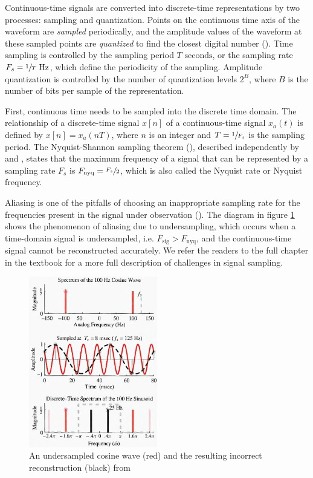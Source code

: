 \documentclass[report.tex]{subfiles}
\begin{document}
Continuous-time signals are converted into discrete-time representations by two processes: sampling and quantization. Points on the continuous time axis of the waveform are \textit{sampled} periodically, and the amplitude values of the waveform at these sampled points are \textit{quantized} to find the closest digital number (\cite[Chapter~2]{melbook}). Time sampling is controlled by the sampling period $T \text{ seconds}$, or the sampling rate $F_{s} = \sfrac{1}{T} \text{ Hz}$, which define the periodicity of the sampling. Amplitude quantization is controlled by the number of quantization levels $2^{B}$, where $B$ is the number of bits per sample of the representation.

First, continuous time needs to be sampled into the discrete time domain. The relationship of a discrete-time signal $x[n]$ of a continuous-time signal $x_{a}(t)$ is defined by $x[n] = x_{a}(nT)$, where $n$ is an integer and $T = \sfrac{1}{F_{s}}$ is the sampling period. The Nyquist-Shannon sampling theorem (\cite[Chapter~4]{discretebook}), described independently by \textcite{nyquist1928} and \textcite{shannon1948}, states that the maximum frequency of a signal that can be represented by a sampling rate $F_{s}$ is $F_{\text{nyq}} = \sfrac{F_{s}}{2}$, which is also called the Nyquist rate or Nyquist frequency.

Aliasing is one of the pitfalls of choosing an inappropriate sampling rate for the frequencies present in the signal under observation (\cite[Chapter~4]{dspfirst}). The diagram in figure \ref{fig:aliasing} shows the phenomenon of aliasing due to undersampling, which occurs when a time-domain signal is undersampled, i.e. $F_{\text{sig}} > F_{\text{nyq}}$, and the continuous-time signal cannot be reconstructed accurately. We refer the readers to the full chapter in the textbook for a more full description of challenges in signal sampling.

\begin{figure}[ht]
	\centering
	\includegraphics[width=0.5\textwidth]{./images-tftheory/aliasing_undersampling.png}
	\caption{An undersampled cosine wave (red) and the resulting incorrect reconstruction (black) from \textcite{dspfirst}}
	\label{fig:aliasing}
\end{figure}
\end{document}
